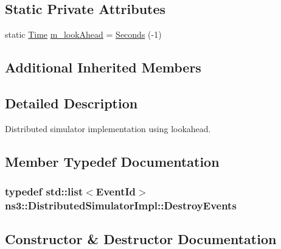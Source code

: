 \subsection*{Static Private Attributes}
\begin{DoxyCompactItemize}
\item 
static \hyperlink{classns3_1_1Time}{Time} \hyperlink{classns3_1_1DistributedSimulatorImpl_af223a2f60c7b91af0b12ba7ba174a47e}{m\+\_\+look\+Ahead} = \hyperlink{group__timecivil_ga33c34b816f8ff6628e33d5c8e9713b9e}{Seconds} (-\/1)
\end{DoxyCompactItemize}
\subsection*{Additional Inherited Members}


\subsection{Detailed Description}
Distributed simulator implementation using lookahead. 

\subsection{Member Typedef Documentation}
\subsubsection[{\texorpdfstring{Destroy\+Events}{DestroyEvents}}]{\setlength{\rightskip}{0pt plus 5cm}typedef {\bf std\+::list}$<${\bf Event\+Id}$>$ {\bf ns3\+::\+Distributed\+Simulator\+Impl\+::\+Destroy\+Events}\hspace{0.3cm}{\ttfamily [private]}}\hypertarget{classns3_1_1DistributedSimulatorImpl_aa24afccd74580b3d5903cc258a51944a}{}\label{classns3_1_1DistributedSimulatorImpl_aa24afccd74580b3d5903cc258a51944a}


\subsection{Constructor \& Destructor Documentation}
